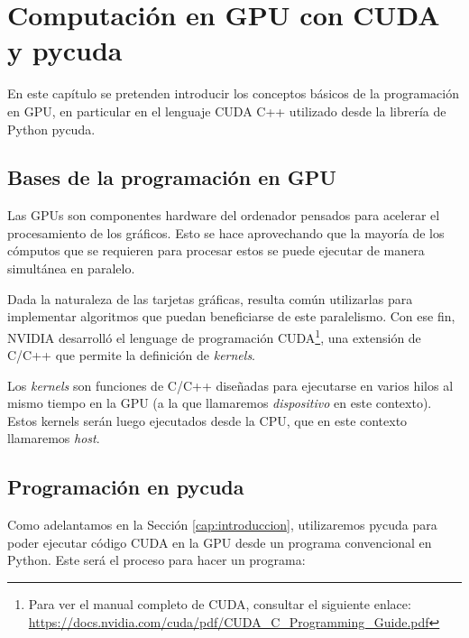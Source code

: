 \chapter{Computación en \ac{GPU} con \ac{CUDA} y pycuda}
\label{cap:computacion}

\begin{resumen}
	En este capítulo se pretenden introducir los conceptos básicos de la programación en \ac{GPU}, en particular en el lenguaje \ac{CUDA} C++ utilizado desde la librería de Python pycuda.
\end{resumen}


\section{Bases de la programación en \ac{GPU}}
Las \ac{GPU}s son componentes hardware del ordenador pensados para acelerar el procesamiento de los gráficos. Esto se hace aprovechando que la mayoría de los cómputos que se requieren para procesar estos se puede ejecutar de manera simultánea en paralelo.

Dada la naturaleza de las tarjetas gráficas, resulta común utilizarlas para implementar algoritmos que puedan beneficiarse de este paralelismo. Con ese fin, NVIDIA desarrolló el lenguage de programación \ac{CUDA}\footnote{Para ver el manual completo de CUDA, consultar el siguiente enlace: \url{https://docs.nvidia.com/cuda/pdf/CUDA_C_Programming_Guide.pdf}}, una extensión de C/C++ que permite la definición de \emph{kernels}. 

Los \emph{kernels} son funciones de C/C++ diseñadas para ejecutarse en varios hilos al mismo tiempo en la \ac{GPU} (a la que llamaremos \emph{dispositivo} en este contexto). Estos kernels serán luego ejecutados desde la \ac{CPU}, que en este contexto llamaremos \emph{host}.



\section{Programación en pycuda}
Como adelantamos en la Sección \ref{cap:introduccion}, utilizaremos pycuda para poder ejecutar código \ac{CUDA} en la \ac{GPU} desde un programa convencional en Python. Este será el proceso para hacer un programa:

